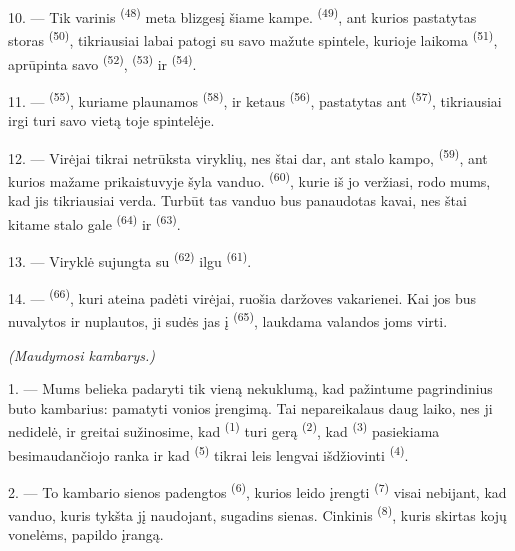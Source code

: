 10. --- Tik varinis  \textsuperscript{(48)} meta blizgesį šiame
kampe.  \textsuperscript{(49)}, ant kurios pastatytas storas
 \textsuperscript{(50)}, tikriausiai labai patogi su savo mažute
spintele, kurioje laikoma  \textsuperscript{(51)}, aprūpinta
savo  \textsuperscript{(52)}, 
\textsuperscript{(53)} ir  \textsuperscript{(54)}.

\VUsaut{4.0mm}
\VUsaut{3.0mm}

11. ---  \textsuperscript{(55)}, kuriame plaunamos
 \textsuperscript{(58)}, ir ketaus 
\textsuperscript{(56)}, pastatytas ant 
\textsuperscript{(57)}, tikriausiai irgi turi savo vietą toje spintelėje.

12. --- Virėjai tikrai netrūksta viryklių, nes štai dar, ant stalo kampo,
 \textsuperscript{(59)}, ant kurios mažame prikaistuvyje šyla
vanduo.  \textsuperscript{(60)}, kurie iš jo veržiasi, rodo mums, kad
jis tikriausiai verda. Turbūt tas vanduo bus panaudotas kavai, nes štai kitame stalo
gale  \textsuperscript{(64)} ir 
\textsuperscript{(63)}.

13. --- Viryklė sujungta su  \textsuperscript{(62)} ilgu
 \textsuperscript{(61)}.

14. ---  \textsuperscript{(66)}, kuri ateina padėti
virėjai, ruošia daržoves vakarienei. Kai jos bus nuvalytos ir nuplautos, ji sudės jas
į  \textsuperscript{(65)}, laukdama valandos joms virti.

\VUsaut{4.0mm}
{\centering\fontsize{10.2pt}{10.2pt}\selectfont{} \textit{(Maudymosi kambarys.)}\par}
\VUsaut{3.0mm}

1. --- Mums belieka padaryti tik vieną nekuklumą, kad pažintume pagrindinius buto
kambarius: pamatyti vonios įrengimą. Tai nepareikalaus daug laiko, nes ji nedidelė,
ir greitai sužinosime, kad  \textsuperscript{(1)} turi gerą
 \textsuperscript{(2)}, kad 
\textsuperscript{(3)} pasiekiama besimaudančiojo ranka ir kad  \textsuperscript{(5)} tikrai leis lengvai išdžiovinti 
\textsuperscript{(4)}.

2. --- To kambario sienos padengtos 
\textsuperscript{(6)}, kurios leido įrengti 
\textsuperscript{(7)} visai nebijant, kad vanduo, kuris tykšta jį naudojant, sugadins
sienas. Cinkinis  \textsuperscript{(8)}, kuris skirtas kojų
vonelėms, papildo įrangą.

\VUsaut{6.0mm}
\VUfilet{22mm}

